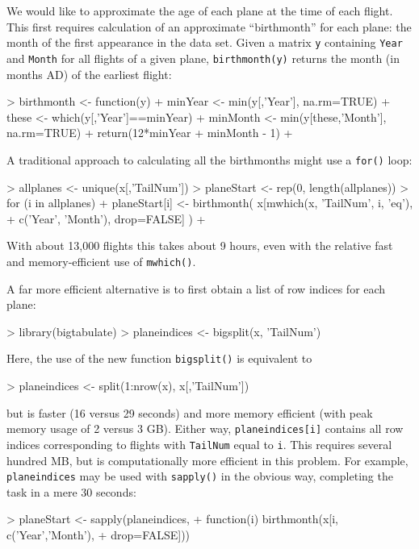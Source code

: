 \documentclass[12pt]{article}
\newcommand{\code}[1]{\texttt{#1}}
\begin{document}
We would like to approximate the age of each plane at the time of
each flight.  This first requires calculation of an approximate
``birthmonth'' for each plane: the month of the first
appearance in the data set.  Given a matrix
\texttt{y} containing \texttt{Year} and \code{Month} for all flights
of a given plane, \texttt{birthmonth(y)} returns the
month (in months AD) of the earliest flight:
\begin{Schunk}
\begin{Sinput}
> birthmonth <- function(y) {
+   minYear <- min(y[,'Year'], na.rm=TRUE)
+   these <- which(y[,'Year']==minYear)
+   minMonth <- min(y[these,'Month'], na.rm=TRUE)
+   return(12*minYear + minMonth - 1)
+ }
\end{Sinput}
\end{Schunk}
A traditional approach to calculating all the birthmonths might use a \code{for()} loop:
\begin{Schunk}
\begin{Sinput}
> allplanes <- unique(x[,'TailNum'])
> planeStart <- rep(0, length(allplanes))
> for (i in allplanes) {
+   planeStart[i] <- birthmonth( x[mwhich(x, 'TailNum', i, 'eq'),
+                                  c('Year', 'Month'), drop=FALSE] )
+ }
\end{Sinput}
\end{Schunk}
With about 13,000 flights this takes about 9 hours, even with the relative
fast and memory-efficient use of \texttt{mwhich()}.

A far more efficient alternative is to first obtain a list of row indices
for each plane:
\begin{Schunk}
\begin{Sinput}
> library(bigtabulate)
> planeindices <- bigsplit(x, 'TailNum')
\end{Sinput}
\end{Schunk}
Here, the use of the new function \code{bigsplit()} is equivalent to
\begin{Schunk}
\begin{Sinput}
> planeindices <- split(1:nrow(x), x[,'TailNum'])
\end{Sinput}
\end{Schunk}
but is faster (16 versus 29 seconds) and more memory efficient (with
peak memory usage of 2 versus 3 GB).
Either way,
\texttt{planeindices[i]} contains all row indices corresponding to flights
with \texttt{TailNum} equal to \texttt{i}.  This requires several hundred MB,
but is computationally more efficient in this problem.  For example,
\texttt{planeindices} may be used with \code{sapply()} in the obvious way,
completing the task in a mere 30 seconds:
\begin{Schunk}
\begin{Sinput}
> planeStart <- sapply(planeindices,
+                      function(i) birthmonth(x[i, c('Year','Month'),
+                                               drop=FALSE]))
\end{Sinput}
\end{Schunk} 
\end{document}
